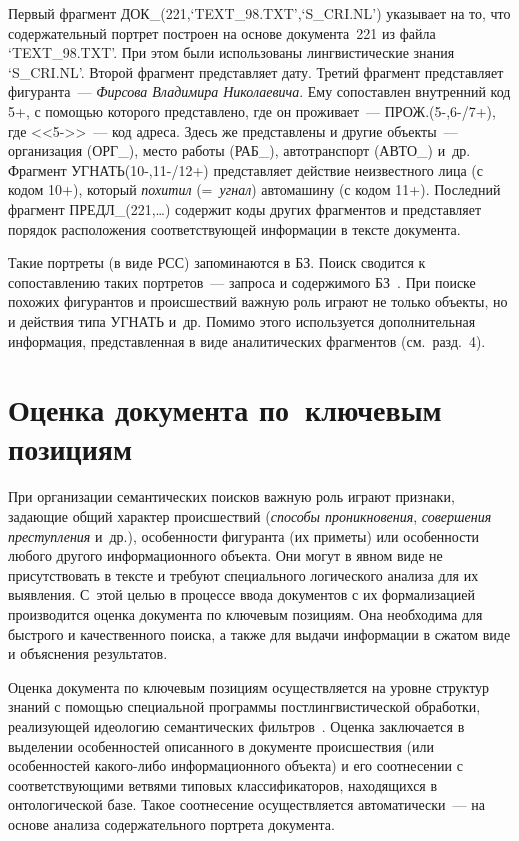\begin{multicols}{2}
    Первый фрагмент ДОК\_(221,`TEXT\_98.TXT',\linebreak `S\_CRI.NL') указывает на 
то, что содержательный портрет построен на основе документа~221 из файла 
`TEXT\_98.TXT'. При этом были использованы лингвистические знания 
`S\_CRI.NL'. Второй фрагмент представляет дату. Третий фрагмент 
представляет фигуранта~--- \textit{Фирсова Владимира Николаевича}. Ему 
сопоставлен внутренний код 5+, с помощью которого представлено, где он 
проживает~--- ПРОЖ.\mbox{(5-,6-/7+)}, где <<5->>~--- код адреса. Здесь же 
представлены и другие объекты~--- организация (ОРГ\_), место работы (РАБ\_), 
автотранспорт (АВТО\_) и~др. Фрагмент УГНАТЬ(10-,11-/12+) представляет 
действие неизвестного лица (с кодом 10+), который \textit{похитил} (\mbox{=\ 
\textit{угнал}}) автомашину (с кодом 11+). Последний фрагмент 
ПРЕДЛ\_(221,\ldots) содержит коды других фрагментов и представляет порядок 
расположения соответствующей информации в тексте документа.
    
    Такие портреты (в виде РСС) запоминаются в БЗ. Поиск сводится к 
сопоставлению таких портретов~--- запроса и содержимого БЗ~\cite{3sha, 8sha}. 
При поиске похожих фигурантов и происшествий важную роль играют не 
только объекты, но и действия типа УГНАТЬ и~др. Помимо этого используется 
дополнительная информация, представленная в виде аналитических 
фрагментов (см.\ разд.~4).
    
\section{Оценка документа по~ключевым позициям}
    
    При организации семантических поисков важную роль играют признаки, 
задающие общий характер происшествий (\textit{способы проникновения}, 
\textit{совершения преступления} и~др.), особенности фигуранта (их приметы) 
или особенности любого другого информационного объекта. Они могут в 
явном виде не присутствовать в тексте и требуют специального логического 
анализа для их выявления. С~этой целью в процессе ввода документов с их 
формализацией производится оценка документа по ключевым позициям. Она 
необходима для быстрого и качественного поиска, а также для выдачи 
информации в сжатом виде и объяснения результатов.
    
    Оценка документа по ключевым позициям осуществляется на уровне 
структур знаний с помощью специальной программы постлингвистической\linebreak 
обработки, реализующей идеологию семантических
    фильтров~\cite{5sha, 6sha, 7sha}. Оценка заключается в выделении 
особенностей описанного в документе происшест\-вия (или особенностей 
какого-либо информационного объекта) и его соотнесении с 
соответствующими ветвями типовых классификаторов, находящих\-ся в 
онтологической базе. Такое соотнесение осуществляется автоматически~--- на 
основе анализа содержательного портрета документа.
    

\end{multicols}

